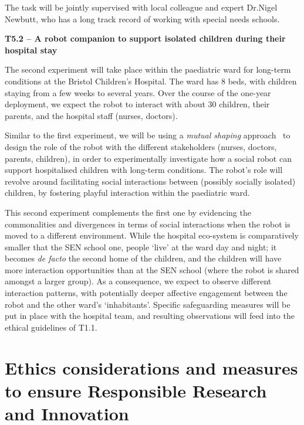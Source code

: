 The task will be jointly supervised with local colleague and expert Dr.Nigel Newbutt,
who has a long track record of working with special needs schools.

\textbf{T5.2 -- A robot companion to support isolated children during their
hospital stay}

The second experiment will take place within the paediatric ward for long-term
conditions at the Bristol Children's Hospital. The ward has 8 beds, with
children staying from a few weeks to several years. Over the course of the
one-year deployment, we expect the robot to interact with about 30 children,
their parents, and the hospital staff (nurses, doctors).

Similar to the first experiment, we will be using a \emph{mutual shaping}
approach~\cite{winkle2018social} to design the role of the robot with the
different stakeholders (nurses, doctors, parents, children), in order to
experimentally investigate how a social robot can support hospitalised children
with long-term conditions. The robot's role will revolve around facilitating
social interactions between (possibly socially isolated) children, by fostering
playful interaction within the paediatric ward.

This second experiment complements the first one by evidencing the commonalities
and divergences in terms of social interactions when the robot is moved to a
different environment. While the hospital eco-system is comparatively smaller that the SEN school one,
people `live' at the ward day and night; it becomes \emph{de facto} the second home of the
children, and the children will have more interaction opportunities than at the
SEN school (where the robot is shared amongst a larger group). As a consequence,
we expect to observe different interaction patterns, with potentially deeper
affective engagement between the robot and the other ward's `inhabitants'.
Specific safeguarding measures will be put in place with the hospital team, and
resulting observations will feed into the ethical guidelines of T1.1.


\section{Ethics considerations and measures to ensure Responsible Research and Innovation}

